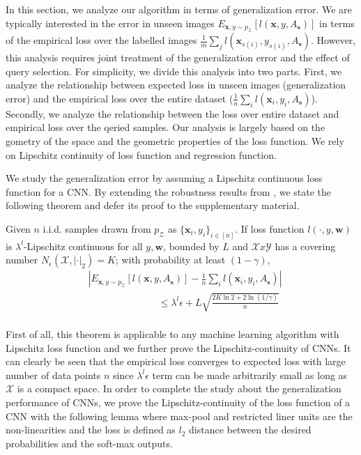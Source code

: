 In this section, we analyze our algorithm in terms of generalization error.  We are typically interested in the error in unseen images $E_{\mathbf{x},y \sim p_\mathcal{Z}}[l(\mathbf{x},y,A_{\mathbf{s}})]$ in terms of the empirical loss over the labelled images $\frac{1}{m}\sum_j l(\mathbf{x}_{s(i)},y_{s(i)},A_{\mathbf{s}})$. However, this analysis requires joint treatment of the generalization error and the effect of query selection. For simplicity, we divide this analysis into two parts. First, we analyze the relationship between expected loss in unseen images (generalization error) and the empirical loss over the entire dataset ($\frac{1}{n}\sum_i l(\mathbf{x}_i,y_i,A_\mathbf{s})$). Secondly, we analyze the relationship between the loss over entire dataset and empirical loss over the qeried samples. Our analysis is largely based on the gometry of the space and the geometric properties of the loss function. We rely on Lipschitz continuity of loss function and regression function. 

We study the generalization error by assuming a Lipschitz continuous loss function for a CNN. By extending the robustness results from \cite{robust}, we state the following theorem and defer its proof to the supplementary material.
\begin{theorem}
Given $n$ i.i.d. samples drawn from $p_\mathcal{Z}$ as $\{\mathbf{x}_i,y_i\}_{i\in[n]}$. If loss function $l(\cdot,y,\mathbf{w})$ is $\lambda^l$-Lipschitz continuous for all $y, \mathbf{w}$, bounded by $L$ and $\mathcal{X}x\mathcal{Y}$ has a covering number $N_{\epsilon}(\mathcal{X},|\cdot|_2)=K$; with probability at least $(1-\gamma)$,
\[
\begin{aligned}
&\left|E_{\mathbf{x},y \sim p_\mathcal{Z}}[l(\mathbf{x},y, A_\mathbf{s})] - \frac{1}{n}\sum_i l(\mathbf{x}_i,y_i,A_\mathbf{s})\right| \\
 &\hspace{3cm}\leq  \lambda^l \epsilon + L \sqrt{\frac{2K\ln 2 + 2\ln (1/\gamma)}{n}}\\
\end{aligned}
\]
\label{mainthm}
\end{theorem}

First of all, this theorem is applicable to any machine learning algorithm with Lipschitz loss function and we further prove the Lipschitz-continuity of CNNs. It can clearly be seen that the empirical loss converges to expected loss with large number of data points $n$ since $\lambda^l\epsilon$ term can be made arbitrarily small as long as $\mathcal{X}$ is a compact space. In order to complete the study about the generalization performance of CNNs, we prove the Lipschitz-continuity of the loss function of a CNN with the following lemma where max-pool and restricted liner units are the non-linearities and the loss is defined as $l_2$ distance between the desired probabilities and the soft-max outputs.

